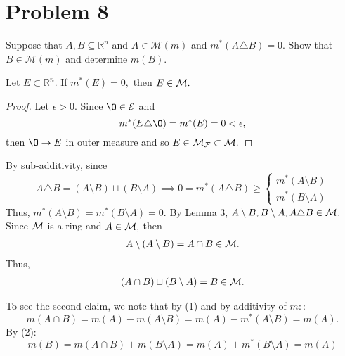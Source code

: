 \documentclass[11pt]{article}
\newcommand{\bbR}{\mathbb{R}}
\renewcommand{\emptyset}{\O}
\newcommand{\sm}{\setminus}
\begin{document}
\section*{Problem 8}
\begin{problem}
    Suppose that $A,B \subseteq \bbR^n$ and $A \in \mathcal{M}(m)$ and $m^*(A \triangle B) = 0.$ Show that $B \in \mathcal{M}(m)$ and determine $m(B).$
\end{problem}
\begin{solution}
\begin{lemma}
    Let $E\subset \bbR^n.$ If $m^*(E) = 0,$ then $E\in \cal M.$
\end{lemma}
\begin{proof}
Let $\epsilon>0.$ 
    Since $\emptyset \in \cal E$ and 
    \[m^*(E \triangle \emptyset) = m^*(E) = 0 < \epsilon,\] then $\emptyset \to E$ in outer measure and so $E \in \cal M_F\subset \cal M.$   
\end{proof}

By sub-additivity, since 
\[A \triangle B= (A\sm B) \sqcup (B\sm A) \implies 0  = m^*(A\triangle B)\geq \begin{cases}
    m^*(A \sm B)\\
    m^*(B\sm A)
\end{cases}\]
Thus, $m^*(A\sm B) = m^*(B\sm A) = 0.$ By Lemma 3, $A\sm B, B\sm A, A\triangle B \in \cal M.$ Since $\cal M$ is a ring and $A\in \cal M,$ then 
\begin{align}
A\sm (A\sm B) = A\cap B \in \cal M.    
\end{align}
 Thus, 
 \begin{align}
(A\cap B) \sqcup (B\sm A) = B \in \cal M.     
 \end{align}
 

To see the second claim, we note that by (1) and by additivity of $m:$:
\[m(A \cap B) = m(A) - m(A \sm B) = m(A) - m^*(A\sm B) = m(A).\]
By (2):
\[m(B) = m(A\cap B) + m(B\sm A) = m(A) + m^*(B\sm A) = m(A)\]

\end{solution}
\end{document}

